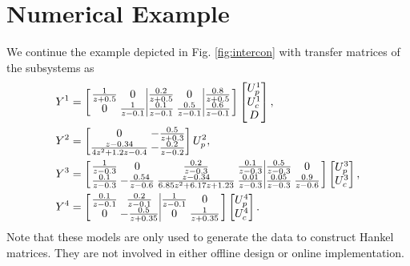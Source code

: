 \documentclass[11pt,print,draftcls,onecolumn,romanappendices]{ieeecolor}
\newcommand{\revise}[1]{{\color{black} #1}}
\begin{document}
\revise{\section{Numerical Example}\label{sec:example}
We continue the example depicted in Fig. \ref{fig:intercon} with transfer matrices of the subsystems as
\begin{subequations}\setlength{\arraycolsep}{1.1pt}
	\begin{align}
		Y^1&=\left[\begin{array}{cc|cc|c}
			\frac{1}{z+0.5}&0&\frac{0.2}{z+0.5}&0&\frac{0.8}{z+0.5}\\0&\frac{1}{z-0.1}&\frac{0.1}{z-0.1}&\frac{0.5}{z-0.1}&\frac{0.6}{z-0.1}
		\end{array}\right]\begin{bmatrix}
			U_p^1 \\U_c^1\\ D
		\end{bmatrix},\\
		Y^2&=\begin{bmatrix}
			0&-\frac{0.5}{z+0.3}\\\frac{z-0.34}{4z^2+1.2z-0.4}&-\frac{0.2}{z-0.2}
		\end{bmatrix}U_p^2,\\
		Y^3&=\left[\begin{array}{cccc|cc}
			\frac{1}{z-0.3}&0&\frac{0.2}{z-0.3}&\frac{0.1}{z-0.3}&\frac{0.5}{z-0.3}&0\\
			\frac{0.1}{z-0.3}&-\frac{0.54}{z-0.6}&\frac{z-0.34}{6.85z^2+6.17z+1.23}&\frac{0.01}{z-0.3}&\frac{0.05}{z-0.3}&\frac{0.9}{z-0.6}
		\end{array}\right]\begin{bmatrix}
		    U_p^3\\ U_c^3
		\end{bmatrix},\\
		Y^4&=\left[\begin{array}{cc|cc}
			\frac{0.1}{z-0.1}&\frac{0.2}{z-0.1}&\frac{1}{z-0.1}&0\\0&-\frac{0.5}{z+0.35}&0&\frac{1}{z+0.35}
		\end{array}\right]\begin{bmatrix}
			U_p^4 \\U_c^4
		\end{bmatrix}.
	\end{align}
\end{subequations}
Note that these models are only used to generate the data to construct Hankel matrices. They are not involved in either offline design or online implementation.

}
\end{document}
